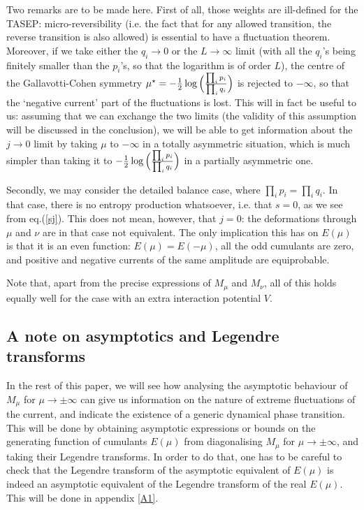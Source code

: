 \documentclass[aps,pre,onecolumn,showpacs,showkeys,a4paper]{revtex4-1}
\begin{document}
Two remarks are to be made here. First of all, those weights are ill-defined for the TASEP: micro-reversibility (i.e. the fact that for any allowed transition, the reverse transition is also allowed) is essential to have a fluctuation theorem. Moreover, if we take either the $q_i\rightarrow 0$ or the $L\rightarrow\infty$ limit (with all the $q_i$'s being finitely smaller than the $p_i$'s, so that the logarithm is of order $L$), the centre of the Gallavotti-Cohen symmetry $\mu^\star=-\frac{1}{2}\log{\Bigl(\frac{\prod_i p_i}{\prod_i q_i}\Bigr)}$ is rejected to $-\infty$, so that the `negative current' part of the fluctuations is lost. This will in fact be useful to us: assuming that we can exchange the two limits (the validity of this assumption will be discussed in the conclusion), we will be able to get information about the $j\rightarrow 0$ limit by taking $\mu$ to $-\infty$ in a totally asymmetric situation, which is much simpler than taking it to $-\frac{1}{2}\log{\Bigl(\frac{\prod_i p_i}{\prod_i q_i}\Bigr)}$ in a partially asymmetric one.

Secondly, we may consider the detailed balance case, where $\prod_i p_i=\prod_i q_i$. In that case, there is no entropy production whatsoever, i.e. that $s= 0$, as we see from eq.(\ref{sj}). This does not mean, however, that $j=0$: the deformations through $\mu$ and $\nu$ are in that case not equivalent. The only implication this has on $E(\mu)$ is that it is an even function: $E(\mu)=E(-\mu)$, all the odd cumulants are zero, and positive and negative currents of the same amplitude are equiprobable.

Note that, apart from the precise expressions of $M_\mu$ and $M_\nu$, all of this holds equally well for the case with an extra interaction potential $V$.

\subsection{A note on asymptotics and Legendre transforms}

In the rest of this paper, we will see how analysing the asymptotic behaviour of $M_\mu$ for $\mu\rightarrow\pm\infty$ can give us information on the nature of extreme fluctuations of the current, and indicate the existence of a generic dynamical phase transition. This will be done by obtaining asymptotic expressions or bounds on the generating function of cumulants $E(\mu)$ from diagonalising $M_\mu$ for $\mu\rightarrow\pm\infty$, and taking their Legendre transforms. In order to do that, one has to be careful to check that the Legendre transform of the asymptotic equivalent of $E(\mu)$ is indeed an asymptotic equivalent of the Legendre transform of the real $E(\mu)$. This will be done in appendix \ref{A1}.
\end{document}

